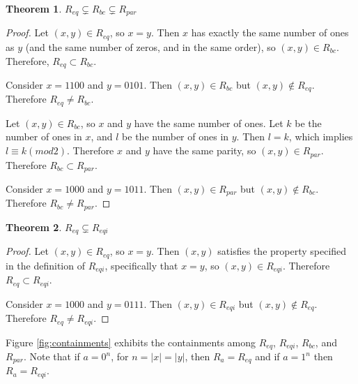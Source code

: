 \documentclass{article}
\newtheorem{theorem}{Theorem}[section]
\theoremstyle{definition}
\begin{document}
\begin{theorem}$R_{eq} \subsetneq R_{bc} \subsetneq R_{par}$\end{theorem}
\begin{proof}
  Let $(x, y)\in R_{eq}$, so $x=y$. Then $x$ has exactly the same number of ones
  as $y$ (and the same number of zeros, and in the same order), so $(x, y) \in
  R_{bc}$. Therefore, $R_{eq} \subset R_{bc}$.
 
  Consider $x=1100$ and $y=0101$. Then $(x, y)\in R_{bc}$ but $(x, y) \notin
  R_{eq}$. Therefore $R_{eq} \neq R_{bc}$.

  Let $(x, y)\in R_{bc}$, so $x$ and $y$ have the same number of ones. Let $k$
  be the number of ones in $x$, and $l$ be the number of ones in $y$. Then
  $l=k$, which implies $l \equiv k (mod 2)$. Therefore $x$ and $y$ have the
  same parity, so $(x, y)\in R_{par}$. Therefore $R_{bc} \subset R_{par}$.

  Consider $x=1000$ and $y=1011$. Then $(x, y)\in R_{par}$ but $(x, y) \notin
  R_{bc}$. Therefore $R_{bc} \neq R_{par}$.
\end{proof}

\begin{theorem}$R_{eq} \subsetneq R_{eqi}$\end{theorem}
\begin{proof}
  Let $(x, y)\in R_{eq}$, so $x=y$. Then $(x, y)$ satisfies the property
  specified in the definition of $R_{eqi}$, specifically that $x=y$, so
  $(x, y) \in R_{eqi}$. Therefore $R_{eq} \subset R_{eqi}$.

  Consider $x=1000$ and $y=0111$. Then $(x, y)\in R_{eqi}$ but $(x, y) \notin
  R_{eq}$. Therefore $R_{eq} \neq R_{eqi}$.
\end{proof}

Figure \ref{fig:containments} exhibits the containments among $R_{eq}$,
$R_{eqi}$, $R_{bc}$, and $R_{par}$. Note that if $a=0^n$, for $n=|x|=|y|$, then
$R_{a}=R_{eq}$ and if $a=1^n$ then $R_{a}=R_{eqi}$.
\end{document}
